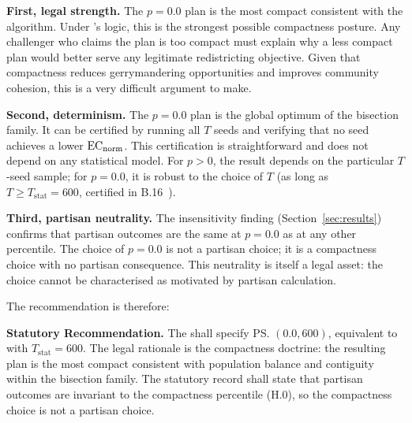 \textbf{First, legal strength.}
The $p = 0.0$ plan is the most compact consistent with the algorithm.
Under \karcher{}'s logic, this is the strongest possible compactness
posture.
Any challenger who claims the plan is too compact must explain why a less
compact plan would better serve any legitimate redistricting objective.
Given that compactness reduces gerrymandering opportunities and improves
community cohesion, this is a very difficult argument to make.

\textbf{Second, determinism.}
The $p = 0.0$ plan is the global optimum of the bisection family.
It can be certified by running all $T$ seeds and verifying that no seed
achieves a lower $\mathrm{EC}_{\mathrm{norm}}$.
This certification is straightforward and does not depend on any statistical
model.
For $p > 0$, the result depends on the particular $T$-seed sample; for
$p = 0.0$, it is robust to the choice of $T$ (as long as $T \geq T_{\mathrm{stat}}
= 600$, certified in B.16~\citep{b16paper}).

\textbf{Third, partisan neutrality.}
The insensitivity finding (Section~\ref{sec:results}) confirms that
partisan outcomes are the same at $p = 0.0$ as at any other percentile.
The choice of $p = 0.0$ is not a partisan choice; it is a compactness
choice with no partisan consequence.
This neutrality is itself a legal asset: the choice cannot be characterised
as motivated by partisan calculation.

The recommendation is therefore:
\begin{statute}
\textbf{Statutory Recommendation.}
The \dia{} shall specify \ps{}$(0.0, 600)$, equivalent to \cs{} with
$T_{\mathrm{stat}} = 600$.
The legal rationale is the compactness doctrine: the resulting plan is the
most compact consistent with population balance and contiguity within the
\ar{} bisection family.
The statutory record shall state that partisan outcomes are invariant to
the compactness percentile (H.0), so the compactness choice is not a
partisan choice.
\end{statute}
